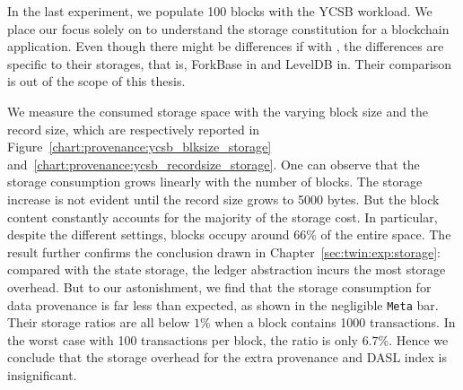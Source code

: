 In the last experiment, we populate 100 blocks with the YCSB workload. 
We place our focus solely on {\fsO} to understand the storage constitution for a blockchain application. 
Even though there might be differences if with {\fsPrO}, the differences are specific to their storages, that is, ForkBase in {\fsO} and LevelDB in{\fsPrO}. 
Their comparison is out of the scope of this thesis. 

We measure the consumed storage space with the varying block size and the record size, 
which are respectively reported in Figure~\ref{chart:provenance:ycsb_blksize_storage} and~\ref{chart:provenance:ycsb_recordsize_storage}. 
One can observe that the storage consumption grows linearly with the number of blocks. 
The storage increase is not evident until the record size grows to 5000 bytes. 
But the block content constantly accounts for the majority of the storage cost.
In particular, despite the different settings, blocks occupy around $66$\% of the entire space. 
The result further confirms the conclusion drawn in Chapter~\ref{sec:twin:exp:storage}: compared with the state storage, the ledger abstraction incurs the most storage overhead. 
But to our astonishment, we find that the storage consumption for data provenance is far less than expected, as shown in the negligible \texttt{Meta} bar. 
Their storage ratios are all below $1$\% when a block contains 1000 transactions. 
In the worst case with 100 transactions per block, the ratio is only $6.7$\%.
Hence we conclude that the storage overhead for the extra provenance and DASL index is insignificant. 
